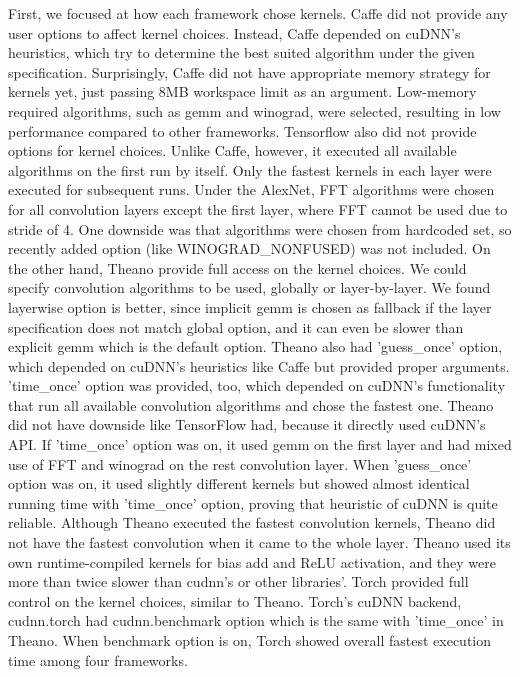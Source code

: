 First, we focused at how each framework chose kernels.
Caffe did not provide any user options to affect kernel choices.
Instead, Caffe depended on cuDNN's heuristics, which try to determine the best suited algorithm under the given specification.
Surprisingly, Caffe did not have appropriate memory strategy for kernels yet, just passing 8MB workspace limit as an argument.
Low-memory required algorithms, such as gemm and winograd, were selected, resulting in low performance compared to other frameworks.
Tensorflow also did not provide options for kernel choices.
Unlike Caffe, however, it executed all available algorithms on the first run by itself.
Only the fastest kernels in each layer were executed for subsequent runs.
Under the AlexNet, FFT algorithms were chosen for all convolution layers except the first layer, where FFT cannot be used due to stride of 4.
One downside was that algorithms were chosen from hardcoded set, so recently added option (like WINOGRAD\_NONFUSED) was not included.
On the other hand, Theano provide full access on the kernel choices.
We could specify convolution algorithms to be used, globally or layer-by-layer.
We found layerwise option is better, since implicit gemm is chosen as fallback if the layer specification does not match global option, and it can even be slower than explicit gemm which is the default option.
Theano also had 'guess\_once' option, which depended on cuDNN's heuristics like Caffe but provided proper arguments.
'time\_once' option was provided, too, which depended on cuDNN's functionality that run all available convolution algorithms and chose the fastest one.
Theano did not have downside like TensorFlow had, because it directly used cuDNN's API.
If 'time\_once' option was on, it used gemm on the first layer and had mixed use of FFT and winograd on the rest convolution layer.
When 'guess\_once' option was on, it used slightly different kernels but showed almost identical running time with 'time\_once' option, proving that heuristic of cuDNN is quite reliable.
Although Theano executed the fastest convolution kernels, Theano did not have the fastest convolution when it came to the whole layer.
Theano used its own runtime-compiled kernels for bias add and ReLU activation, and they were more than twice slower than cudnn's or other libraries'.
Torch provided full control on the kernel choices, similar to Theano.
Torch's cuDNN backend, cudnn.torch had cudnn.benchmark option which is the same with 'time\_once' in Theano.
When benchmark option is on, Torch showed overall fastest execution time among four frameworks.

